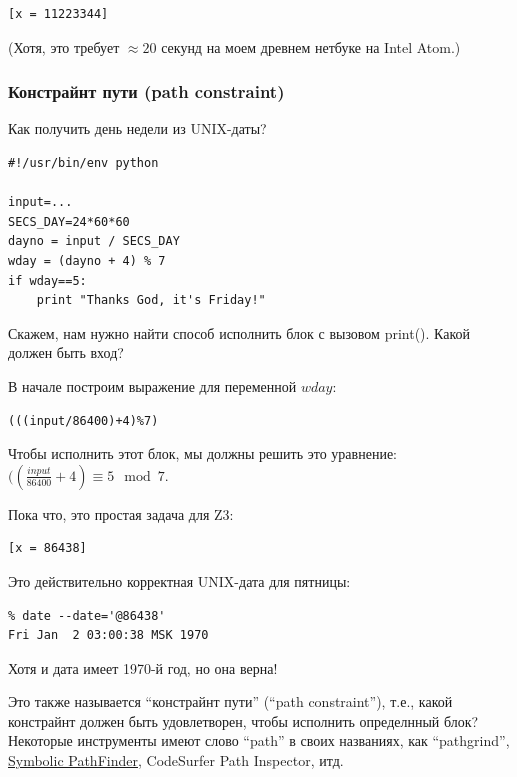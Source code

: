 

\begin{lstlisting}
[x = 11223344]
\end{lstlisting}

(Хотя, это требует $\approx 20$ секунд на моем древнем нетбуке на Intel Atom.)

\subsubsection{Констрайнт пути (path constraint)}

Как получить день недели из UNIX-даты?

\begin{lstlisting}
#!/usr/bin/env python

input=...
SECS_DAY=24*60*60
dayno = input / SECS_DAY
wday = (dayno + 4) % 7
if wday==5:
    print "Thanks God, it's Friday!"
\end{lstlisting}

Скажем, нам нужно найти способ исполнить блок с вызовом print().
Какой должен быть вход?

В начале построим выражение для переменной $wday$:



\begin{lstlisting}
(((input/86400)+4)%7)
\end{lstlisting}

Чтобы исполнить этот блок, мы должны решить это уравнение: $((\frac{input}{86400}+4) \equiv 5 \mod 7$.

Пока что, это простая задача для Z3:



\begin{lstlisting}
[x = 86438]
\end{lstlisting}

Это действительно корректная UNIX-дата для пятницы:

\begin{lstlisting}
% date --date='@86438'
Fri Jan  2 03:00:38 MSK 1970
\end{lstlisting}

Хотя и дата имеет 1970-й год, но она верна!

Это также называется ``констрайнт пути'' (``path constraint''), т.е., какой констрайнт должен быть удовлетворен,
чтобы исполнить определнный блок?
Некоторые инструменты имеют слово ``path'' в своих названиях, как
``pathgrind'', 
\href{http://babelfish.arc.nasa.gov/trac/jpf/wiki/projects/jpf-symbc}{Symbolic PathFinder}, CodeSurfer Path Inspector, итд.

